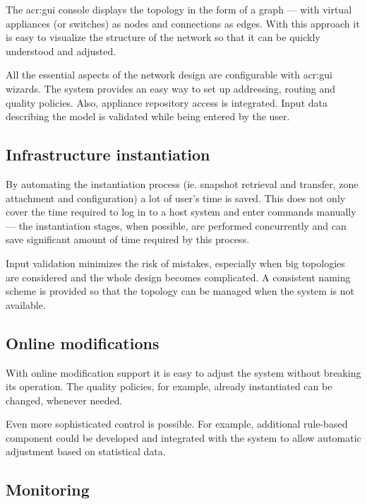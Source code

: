 \documentclass[11pt,openany]{book}
\begin{document}
        The \gls{acr:gui} console displays the topology in the form of a graph --- with virtual appliances (or switches)
        as nodes and connections as edges. With this approach it is easy to visualize the structure of the network so
        that it can be quickly understood and adjusted.

        All the essential aspects of the network design are configurable with \gls{acr:gui} wizards. The system provides
        an easy way to set up addressing, routing and quality policies. Also, appliance repository access is integrated.
        Input data describing the model is validated while being entered by the user. 


      \subsection{Infrastructure instantiation}
      \label{sub:uc:enhance:instantiation}

        By automating the instantiation process (ie. snapshot retrieval and transfer, zone attachment and configuration)
        a lot of user's time is saved. This does not only cover the time required to log in to a host system and enter
        commands manually --- the instantiation stages, when possible, are performed concurrently and can save
        significant amount of time required by this process.

        Input validation minimizes the risk of mistakes, especially when big topologies are considered and the whole
        design becomes complicated. A consistent naming scheme is provided so that the topology can be managed when the
        system is not available.


      \subsection{Online modifications}
      \label{sub:uc:enhance:online}

        With online modification support it is easy to adjust the system without breaking its operation. The quality
        policies, for example, already instantiated can be changed, whenever needed.

        Even more sophisticated control is possible. For example, additional rule-based component could be developed and
        integrated with the system to allow automatic adjustment based on statistical data.


      \subsection{Monitoring}
      \label{sub:uc:enhance:monitoring}
\end{document}
